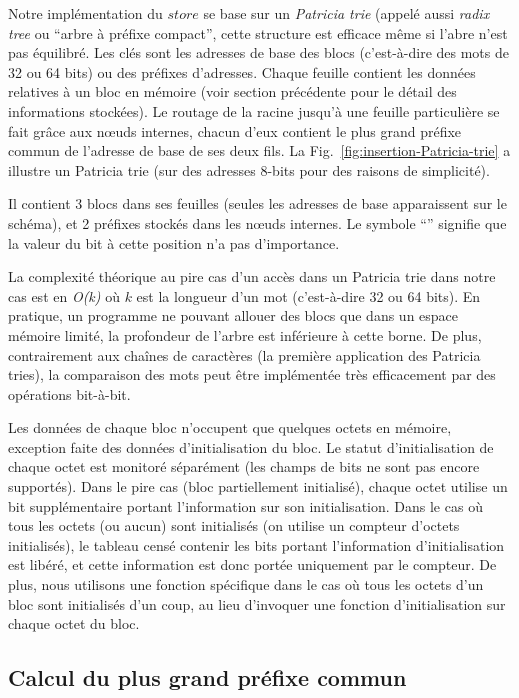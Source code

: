 Notre implémentation du $store$ se base sur un {\em Patricia trie}
\cite{Szpankowski/90} (appelé aussi {\em radix tree} ou ``arbre à préfixe
compact'', cette structure est efficace même si l'abre n'est pas équilibré.
Les clés sont les adresses de base des blocs (c'est-à-dire des mots de 32 ou 64
bits) ou des préfixes d'adresses. Chaque feuille contient les données relatives
à un bloc en mémoire (voir section précédente pour le détail des informations
stockées). Le routage de la racine jusqu'à une feuille particulière se fait
grâce aux n\oe{}uds internes, chacun d'eux contient le plus grand préfixe commun
de l'adresse de base de ses deux fils. La Fig.~\ref{fig:insertion-Patricia-trie}
a illustre un Patricia trie (sur des adresses 8-bits pour des raisons de
simplicité).

Il contient 3 blocs dans ses feuilles (seules les adresses de base apparaissent
sur le schéma), et 2 préfixes stockés dans les n\oe{}uds internes. Le symbole
``{\tt *}'' signifie que la valeur du bit à cette position n'a pas d'importance.

La complexité théorique au pire cas d'un accès dans un Patricia trie dans notre
cas est en {\em O(k)} où $k$ est la longueur d'un mot (c'est-à-dire 32 ou 64
bits). En pratique, un programme ne pouvant allouer des blocs que dans un
espace mémoire limité, la profondeur de l'arbre est inférieure à cette borne.
De plus, contrairement aux chaînes de caractères (la première application des
Patricia tries), la comparaison des mots peut être implémentée très
efficacement par des opérations bit-à-bit.

Les données de chaque bloc n'occupent que quelques octets en mémoire, exception
faite des données d'initialisation du bloc. Le statut d'initialisation de chaque
octet est monitoré séparément
(les champs de bits ne sont pas encore supportés). Dans le pire cas (bloc
partiellement initialisé), chaque octet utilise un bit supplémentaire portant
l'information sur son initialisation. Dans le cas où tous les octets (ou aucun)
sont initialisés (on utilise un compteur d'octets initialisés), le tableau
censé contenir les bits portant l'information d'initialisation est libéré, et
cette information est donc portée uniquement par le compteur. De plus, nous
utilisons une fonction spécifique dans le cas où tous les octets d'un bloc sont
initialisés d'un coup, au lieu d'invoquer une fonction d'initialisation sur
chaque octet du bloc.


\subsection{Calcul du plus grand préfixe commun}


